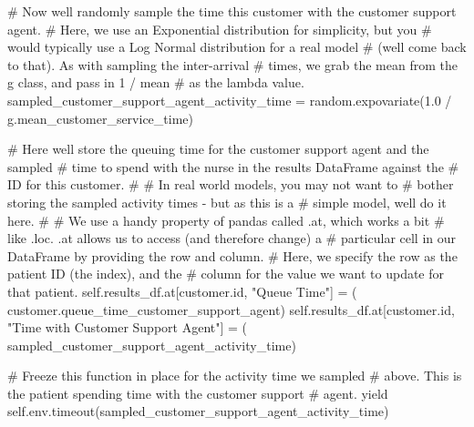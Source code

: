 \documentclass[
  letterpaper,
  DIV=11,
  numbers=noendperiod]{scrreprt}
\newenvironment{Shaded}{\begin{snugshade}}{\end{snugshade}}
\newcommand{\BuiltInTok}[1]{\textcolor[rgb]{0.00,0.23,0.31}{#1}}
\newcommand{\CommentTok}[1]{\textcolor[rgb]{0.37,0.37,0.37}{#1}}
\newcommand{\ControlFlowTok}[1]{\textcolor[rgb]{0.00,0.23,0.31}{#1}}
\newcommand{\FloatTok}[1]{\textcolor[rgb]{0.68,0.00,0.00}{#1}}
\newcommand{\NormalTok}[1]{\textcolor[rgb]{0.00,0.23,0.31}{#1}}
\newcommand{\OperatorTok}[1]{\textcolor[rgb]{0.37,0.37,0.37}{#1}}
\newcommand{\StringTok}[1]{\textcolor[rgb]{0.13,0.47,0.30}{#1}}
\newcommand{\VariableTok}[1]{\textcolor[rgb]{0.07,0.07,0.07}{#1}}
\begin{document}
\begin{tcolorbox}
\begin{Shaded}
\begin{Highlighting}[]
            \CommentTok{\# Now we\textquotesingle{}ll randomly sample the time this customer with the customer support agent.}
            \CommentTok{\# Here, we use an Exponential distribution for simplicity, but you}
            \CommentTok{\# would typically use a Log Normal distribution for a real model}
            \CommentTok{\# (we\textquotesingle{}ll come back to that).  As with sampling the inter{-}arrival}
            \CommentTok{\# times, we grab the mean from the g class, and pass in 1 / mean}
            \CommentTok{\# as the lambda value.}
\NormalTok{            sampled\_customer\_support\_agent\_activity\_time }\OperatorTok{=}\NormalTok{ random.expovariate(}\FloatTok{1.0} \OperatorTok{/}
\NormalTok{                                                        g.mean\_customer\_service\_time)}

            \CommentTok{\# Here we\textquotesingle{}ll store the queuing time for the customer support agent and the sampled}
            \CommentTok{\# time to spend with the nurse in the results DataFrame against the}
            \CommentTok{\# ID for this customer.}
            \CommentTok{\#}
            \CommentTok{\# In real world models, you may not want to}
            \CommentTok{\# bother storing the sampled activity times {-} but as this is a}
            \CommentTok{\# simple model, we\textquotesingle{}ll do it here.}
            \CommentTok{\#}
            \CommentTok{\# We use a handy property of pandas called .at, which works a bit}
            \CommentTok{\# like .loc.  .at allows us to access (and therefore change) a}
            \CommentTok{\# particular cell in our DataFrame by providing the row and column.}
            \CommentTok{\# Here, we specify the row as the patient ID (the index), and the}
            \CommentTok{\# column for the value we want to update for that patient.}
            \VariableTok{self}\NormalTok{.results\_df.at[customer.}\BuiltInTok{id}\NormalTok{, }\StringTok{"Queue Time"}\NormalTok{] }\OperatorTok{=}\NormalTok{ (}
\NormalTok{                customer.queue\_time\_customer\_support\_agent)}
            \VariableTok{self}\NormalTok{.results\_df.at[customer.}\BuiltInTok{id}\NormalTok{, }\StringTok{"Time with Customer Support Agent"}\NormalTok{] }\OperatorTok{=}\NormalTok{ (}
\NormalTok{                sampled\_customer\_support\_agent\_activity\_time)}

            \CommentTok{\# Freeze this function in place for the activity time we sampled}
            \CommentTok{\# above.  This is the patient spending time with the customer support}
            \CommentTok{\# agent.}
            \ControlFlowTok{yield} \VariableTok{self}\NormalTok{.env.timeout(sampled\_customer\_support\_agent\_activity\_time)}


\end{Highlighting}
\end{Shaded}
\end{tcolorbox}
\end{document}
